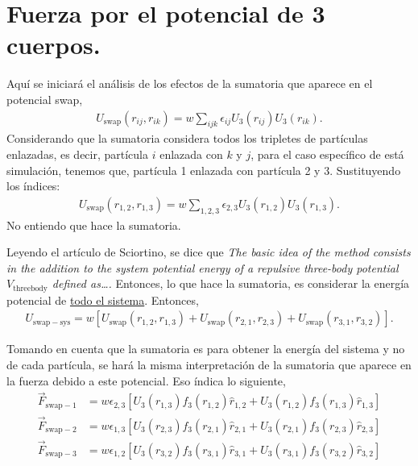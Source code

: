 \documentclass[../main.tex]{subfiles}
\begin{document}
\newpage

\section{Fuerza por el potencial de 3 cuerpos.}

Aquí se iniciará el análisis de los efectos de la sumatoria que aparece en el potencial swap,
\begin{gather*}
    U_{\mathrm{swap}}(r_{ij},r_{ik})=w\sum_{ijk}\epsilon_{ij}U_3(r_{ij})U_3(r_{ik}).
\end{gather*}
Considerando que la sumatoria considera todos los tripletes de partículas enlazadas, es decir, partícula $i$ enlazada con $k$ y $j$, para el caso específico de está simulación, tenemos que,
partícula 1 enlazada con partícula 2 y 3.
Sustituyendo los índices:
\begin{gather*}
    U_{\mathrm{swap}}(r_{1,2},r_{1,3})=w\sum_{1,2,3}\epsilon_{2,3}U_3(r_{1,2})U_3(r_{1,3}).
\end{gather*}
No entiendo que hace la sumatoria.

Leyendo el artículo de Sciortino, se dice que \emph{The basic idea of the method consists in the addition to the system potential energy of a repulsive three-body potential \(V_{\mathrm{threebody}}\) defined as\ldots.}
Entonces, lo que hace la sumatoria, es considerar la energía potencial de \underline{todo el sistema}.
Entonces,
\begin{gather*}
    U_{\mathrm{swap-sys}}=w\left[U_{\mathrm{swap}}(r_{1,2},r_{1,3}) + U_{\mathrm{swap}}(r_{2,1},r_{2,3}) + U_{\mathrm{swap}}(r_{3,1},r_{3,2})\right].
\end{gather*}

Tomando en cuenta que la sumatoria es para obtener la energía del sistema y no de cada partícula, se hará la misma interpretación de la sumatoria que aparece en la fuerza debido a este potencial.
Eso índica lo siguiente,
\begin{align*}
    \vec{F}_{\mathrm{swap}-1} &= w\epsilon_{2,3}\left[
            U_3(r_{1,3})f_3(r_{1,2})\hat{r}_{1,2} + U_3(r_{1,2})f_3(r_{1,3})\hat{r}_{1,3}
    \right] \\
    \vec{F}_{\mathrm{swap}-2} &= w\epsilon_{1,3}\left[
            U_3(r_{2,3})f_3(r_{2,1})\hat{r}_{2,1} + U_3(r_{2,1})f_3(r_{2,3})\hat{r}_{2,3}
    \right] \\
    \vec{F}_{\mathrm{swap}-3} &= w\epsilon_{1,2}\left[
            U_3(r_{3,2})f_3(r_{3,1})\hat{r}_{3,1} + U_3(r_{3,1})f_3(r_{3,2})\hat{r}_{3,2}
    \right]
\end{align*}
\end{document}
